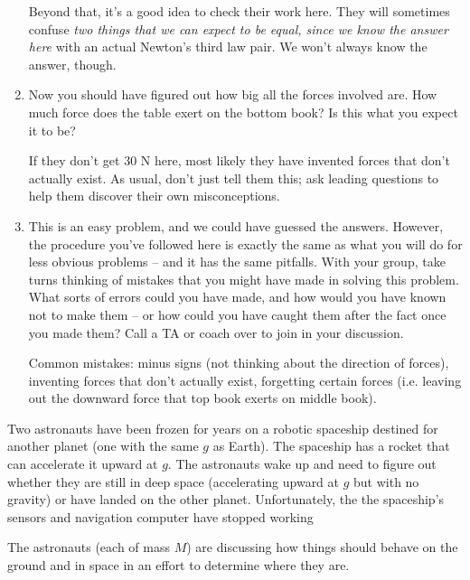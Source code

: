 \documentclass[12pt]{article}
\newcommand{\vsi}{\vspace{0.1in}}
\begin{document}
\begin{enumerate}
{	Beyond that, it's a good idea to check their work here. They will sometimes confuse {\it two things that we can expect to be equal, since we know the answer here} with an actual Newton's third law pair. We won't always know the answer, though.}

\vsi\vsi\vsi\vsi

\item Now you should have figured out how big all the forces involved are. How much force does the table exert on the bottom book? Is this what you expect it to be?

{\color{Red}If they don't get 30 N here, most likely they have invented forces that don't actually exist. As usual, don't just tell them this; ask leading questions to help them discover their own misconceptions.}


\item This is an easy problem, and we could have guessed the answers. However, the procedure you've followed here is exactly the same as what you will do for less obvious problems -- and it has the same pitfalls. With your 
group, take turns thinking of mistakes that you might have made in solving this problem. What sorts of errors could you have made, and how would you have known not to make them -- or how could you have caught them after the
fact once you made them? Call a TA or coach over to join in your discussion.

{\color{Red} Common mistakes: minus signs (not thinking about the direction of forces), inventing forces that don't actually exist, forgetting certain forces (i.e. leaving out the downward force that top book exerts on middle book).}

\end{enumerate}

\small

Two astronauts have been frozen for years on a robotic spaceship destined for another planet (one with the same $g$ as Earth). The spaceship has a rocket that can accelerate it upward at $g$. The astronauts wake up and need to figure out whether they are still in deep space (accelerating upward at $g$ but with no gravity) or have landed on the other planet. Unfortunately, the the spaceship's sensors and navigation computer have stopped working%

The astronauts (each of mass $M$) are discussing how things should behave on the ground and in space in an effort to determine where they are.
\end{document}

